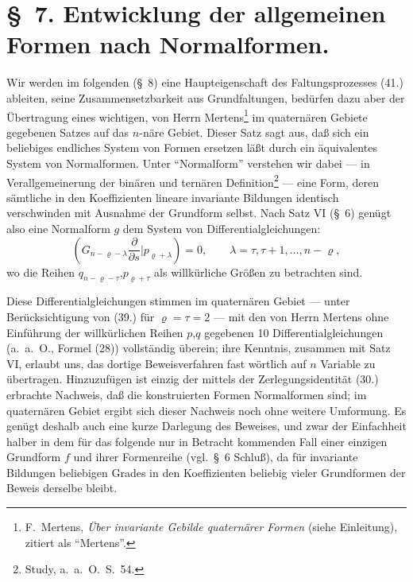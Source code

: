\documentclass[12pt,a4paper]{article}
\begin{document}
\section*{\S\ 7. Entwicklung der allgemeinen Formen nach Normalformen.}

Wir werden im folgenden (\S\ 8) eine Haupteigenschaft des Faltungsprozesses (41.) ableiten, seine Zusammensetzbarkeit aus Grundfaltungen, bedürfen dazu aber der Übertragung eines wichtigen, von Herrn Mertens\footnote{F.\ Mertens, \textit{Über invariante Gebilde quaternärer Formen} (siehe Einleitung), zitiert als ``Mertens''.} im quaternären Gebiete gegebenen Satzes auf das $n$-näre Gebiet. Dieser Satz sagt aus, daß sich ein beliebiges endliches System von Formen ersetzen läßt durch ein äquivalentes System von Normalformen. Unter ``Normalform'' verstehen wir dabei --- in Verallgemeinerung der binären und ternären Definition\footnote{Study, a.\ a.\ O.\ S.~54.} --- eine Form, deren sämtliche in den Koeffizienten lineare invariante Bildungen identisch verschwinden mit Ausnahme der Grundform selbst. Nach Satz VI (\S\ 6) genügt also eine Normalform $g$ dem System von Differentialgleichungen:
\begin{equation}\tag{46}
(G_{n-\varrho-\lambda} \frac{\partial}{\partial s} | p_{\varrho+\lambda}) = 0, \qquad \lambda = \tau, \tau+1, \ldots, n-\varrho,
\end{equation}
wo die Reihen $q_{n-\varrho-\tau}$,$p_{\varrho+\tau}$ als willkürliche Größen zu betrachten sind.

Diese Differentialgleichungen stimmen im quaternären Gebiet --- unter Berücksichtigung von (39.) für $\varrho = \tau = 2$ --- mit den von Herrn Mertens ohne Einführung der willkürlichen Reihen $p$,$q$ gegebenen 10 Differentialgleichungen (a.\ a.\ O., Formel (28)) vollständig überein; ihre Kenntnis, zusammen mit Satz VI, erlaubt uns, das dortige Beweisverfahren fast wörtlich auf $n$ Variable zu übertragen. Hinzuzufügen ist einzig der mittels der Zerlegungsidentität (30.) erbrachte Nachweis, daß die konstruierten Formen Normalformen sind; im quaternären Gebiet ergibt sich dieser Nachweis noch ohne weitere Umformung. Es genügt deshalb auch eine kurze Darlegung des Beweises, und zwar der Einfachheit halber in dem für das folgende nur in Betracht kommenden Fall einer einzigen Grundform $f$ und ihrer Formenreihe (vgl.\ \S\ 6 Schluß), da für invariante Bildungen beliebigen Grades in den Koeffizienten beliebig vieler Grundformen der Beweis derselbe bleibt.
\end{document}
